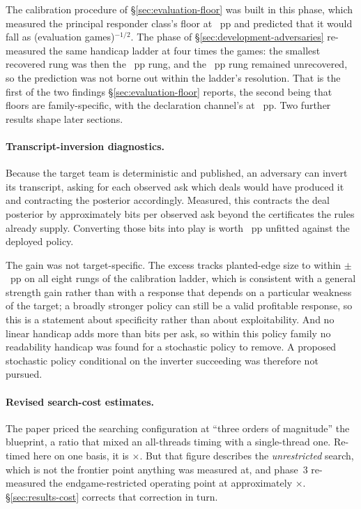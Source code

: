The calibration procedure of \S\ref{sec:evaluation-floor} was built in this phase, which measured
the principal responder class's floor at \vsevenFloorPhaseOne{}~pp and predicted that it would fall
as (evaluation games)$^{-1/2}$. The phase of \S\ref{sec:development-adversaries} re-measured the
same handicap ladder at four times the games: the smallest recovered rung was then the
\vsevenPrimaryFloor{}~pp rung, and the \vsevenFloorRungBelow{}~pp rung remained unrecovered, so the
prediction was not borne out within the ladder's resolution. That is the first of the two findings
\S\ref{sec:evaluation-floor} reports, the second being that floors are family-specific, with the
declaration channel's at \vsevenDeclFloor{}~pp. Two further results shape later sections.

\paragraph{Transcript-inversion diagnostics.} Because the target
team is deterministic and published, an adversary can invert its transcript, asking for each observed
ask which deals would have produced it and contracting the posterior accordingly. Measured, this
contracts the deal posterior by approximately \vsevenBitsPerAsk{} bits per observed ask beyond the
certificates the rules already supply. Converting those bits into play is worth
\vsevenInversionUnfitted{}~pp unfitted against the deployed policy.

The gain was not target-specific. The excess tracks planted-edge size to within
$\pm$\vsevenInversionTrack{}~pp on all eight rungs of the calibration ladder, which is consistent
with a general strength gain rather than with a response that depends on a particular weakness of
the target; a broadly stronger policy can still be a valid profitable response, so this is a
statement about specificity rather than about exploitability. And no linear handicap adds more
than \vsevenHandicapBits{} bits per ask, so within this policy family no readability handicap was
found for a stochastic policy to remove. A proposed stochastic policy conditional on the inverter
succeeding was therefore not pursued.

\paragraph{Revised search-cost estimates.} The \vsix{} paper priced the searching configuration
at ``three orders of magnitude'' the blueprint, a ratio that mixed an all-threads timing with a
single-thread one. Re-timed here on one basis, it is \vsevenPhaseOneCost$\times$. But that figure
describes the \emph{unrestricted} search, which is not the frontier point anything was measured at,
and phase~3 re-measured the endgame-restricted operating point at approximately
\vsevenCostRecorded$\times$. \S\ref{sec:results-cost} corrects that correction in turn.

